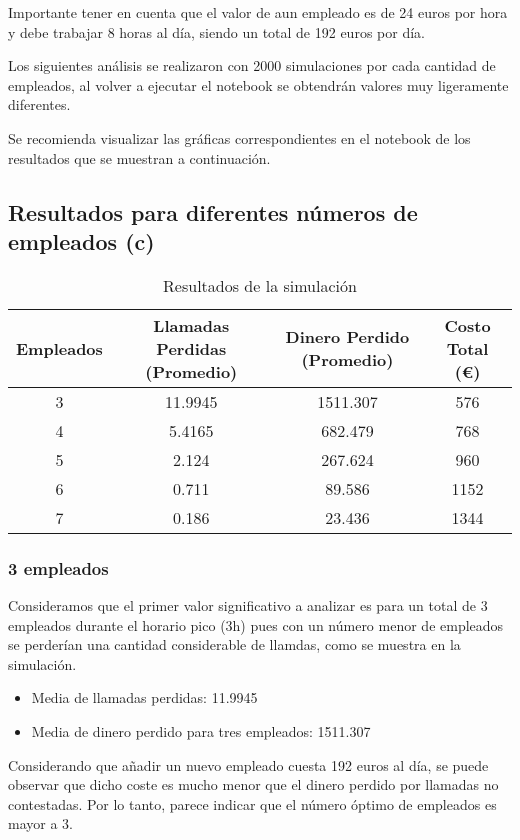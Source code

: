 \documentclass{article}
\begin{document}
Importante tener en cuenta que el valor de aun empleado es de 24 euros por hora y debe trabajar 8 horas al día, siendo un total de 192 euros por día.

Los siguientes análisis se realizaron con 2000 simulaciones por cada cantidad de empleados, al volver a ejecutar el notebook se obtendrán valores muy ligeramente diferentes.

Se recomienda visualizar las gráficas correspondientes en el notebook de los resultados que se muestran a continuación.
\subsection*{Resultados para diferentes números de empleados (c)}


\begin{table}[H]
    \centering
    \caption{Resultados de la simulación}
    \begin{tabular}{cccc}
        \toprule
        Empleados & Llamadas Perdidas (Promedio) & Dinero Perdido (Promedio) & Costo Total (€) \\
        \midrule
        3 & 11.9945 & 1511.307 & 576 \\
        4 & 5.4165 & 682.479 & 768 \\
        5 & 2.124 & 267.624 & 960 \\
        6 & 0.711 & 89.586 & 1152 \\
        7 & 0.186 & 23.436 & 1344 \\
        \bottomrule
    \end{tabular}
\end{table}
\subsubsection*{3 empleados}

Consideramos que el primer valor significativo a analizar es para un total de 3 empleados durante el horario pico (3h) pues con un número menor de empleados se perderían una cantidad considerable de llamdas, como se muestra en la simulación.
\begin{itemize}
    \item Media de llamadas perdidas: 11.9945
    \item Media de dinero perdido para tres empleados: 1511.307
\end{itemize}

Considerando que añadir un nuevo empleado cuesta 192 euros al día, se puede observar que dicho coste es mucho menor que el dinero perdido por llamadas no contestadas. Por lo tanto, parece indicar que el número óptimo de empleados es mayor a 3.
\end{document}

